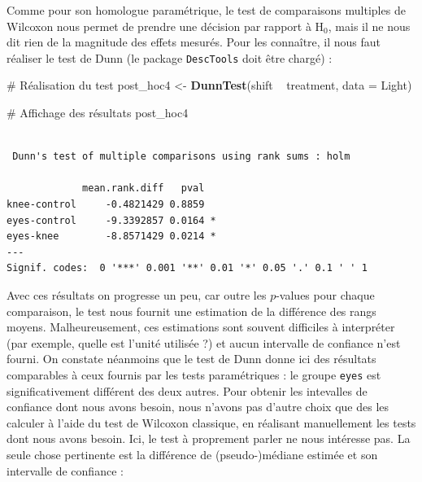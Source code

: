\documentclass[
  a4paper,
]{article}
\newenvironment{Shaded}{\begin{snugshade}}{\end{snugshade}}
\newcommand{\CommentTok}[1]{\textcolor[rgb]{0.54,0.53,0.53}{#1}}
\newcommand{\DataTypeTok}[1]{\textcolor[rgb]{0.00,0.34,0.68}{#1}}
\newcommand{\KeywordTok}[1]{\textcolor[rgb]{0.12,0.11,0.11}{\textbf{#1}}}
\newcommand{\NormalTok}[1]{\textcolor[rgb]{0.12,0.11,0.11}{#1}}
\newcommand{\OperatorTok}[1]{\textcolor[rgb]{0.12,0.11,0.11}{#1}}
\newcommand{\OtherTok}[1]{\textcolor[rgb]{0.00,0.43,0.16}{#1}}
\newcommand{\StringTok}[1]{\textcolor[rgb]{0.75,0.01,0.01}{#1}}
\begin{document}
Comme pour son homologue paramétrique, le test de comparaisons multiples de Wilcoxon nous permet de prendre une décision par rapport à H\(_0\), mais il ne nous dit rien de la magnitude des effets mesurés. Pour les connaître, il nous faut réaliser le test de Dunn (le package \texttt{DescTools} doit être chargé) :

\begin{Shaded}
\begin{Highlighting}[]
\CommentTok{# Réalisation du test}
\NormalTok{post_hoc4 <-}\StringTok{ }\KeywordTok{DunnTest}\NormalTok{(shift }\OperatorTok{~}\StringTok{ }\NormalTok{treatment, }\DataTypeTok{data =}\NormalTok{ Light)}

\CommentTok{# Affichage des résultats}
\NormalTok{post_hoc4}
\end{Highlighting}
\end{Shaded}

\begin{verbatim}

 Dunn's test of multiple comparisons using rank sums : holm  

             mean.rank.diff   pval    
knee-control     -0.4821429 0.8859    
eyes-control     -9.3392857 0.0164 *  
eyes-knee        -8.8571429 0.0214 *  
---
Signif. codes:  0 '***' 0.001 '**' 0.01 '*' 0.05 '.' 0.1 ' ' 1
\end{verbatim}

Avec ces résultats on progresse un peu, car outre les \(p\)-values pour chaque comparaison, le test nous fournit une estimation de la différence des rangs moyens. Malheureusement, ces estimations sont souvent difficiles à interpréter (par exemple, quelle est l'unité utilisée ?) et aucun intervalle de confiance n'est fourni. On constate néanmoins que le test de Dunn donne ici des résultats comparables à ceux fournis par les tests paramétriques : le groupe \texttt{eyes} est significativement différent des deux autres. Pour obtenir les intevalles de confiance dont nous avons besoin, nous n'avons pas d'autre choix que des les calculer à l'aide du test de Wilcoxon classique, en réalisant manuellement les tests dont nous avons besoin. Ici, le test à proprement parler ne nous intéresse pas. La seule chose pertinente est la différence de (pseudo-)médiane estimée et son intervalle de confiance :

\begin{Shaded}
\end{Shaded}
\end{document}

